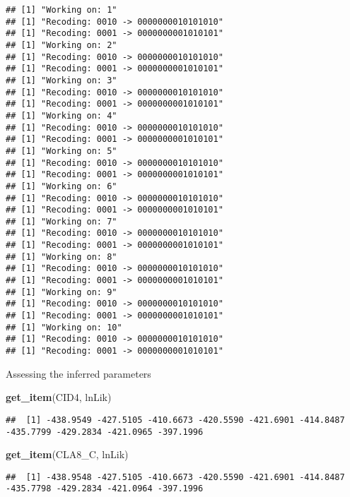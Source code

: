 \documentclass[
]{article}
\newenvironment{Shaded}{\begin{snugshade}}{\end{snugshade}}
\newcommand{\FunctionTok}[1]{\textcolor[rgb]{0.13,0.29,0.53}{\textbf{#1}}}
\newcommand{\NormalTok}[1]{#1}
\newcommand{\StringTok}[1]{\textcolor[rgb]{0.31,0.60,0.02}{#1}}
\begin{document}
\begin{verbatim}
## [1] "Working on: 1"
## [1] "Recoding: 0010 -> 0000000010101010"
## [1] "Recoding: 0001 -> 0000000001010101"
## [1] "Working on: 2"
## [1] "Recoding: 0010 -> 0000000010101010"
## [1] "Recoding: 0001 -> 0000000001010101"
## [1] "Working on: 3"
## [1] "Recoding: 0010 -> 0000000010101010"
## [1] "Recoding: 0001 -> 0000000001010101"
## [1] "Working on: 4"
## [1] "Recoding: 0010 -> 0000000010101010"
## [1] "Recoding: 0001 -> 0000000001010101"
## [1] "Working on: 5"
## [1] "Recoding: 0010 -> 0000000010101010"
## [1] "Recoding: 0001 -> 0000000001010101"
## [1] "Working on: 6"
## [1] "Recoding: 0010 -> 0000000010101010"
## [1] "Recoding: 0001 -> 0000000001010101"
## [1] "Working on: 7"
## [1] "Recoding: 0010 -> 0000000010101010"
## [1] "Recoding: 0001 -> 0000000001010101"
## [1] "Working on: 8"
## [1] "Recoding: 0010 -> 0000000010101010"
## [1] "Recoding: 0001 -> 0000000001010101"
## [1] "Working on: 9"
## [1] "Recoding: 0010 -> 0000000010101010"
## [1] "Recoding: 0001 -> 0000000001010101"
## [1] "Working on: 10"
## [1] "Recoding: 0010 -> 0000000010101010"
## [1] "Recoding: 0001 -> 0000000001010101"
\end{verbatim}

Assessing the inferred parameters

\begin{Shaded}
\begin{Highlighting}[]
\FunctionTok{get\_item}\NormalTok{(CID4, }\StringTok{\textquotesingle{}lnLik\textquotesingle{}}\NormalTok{)}
\end{Highlighting}
\end{Shaded}

\begin{verbatim}
##  [1] -438.9549 -427.5105 -410.6673 -420.5590 -421.6901 -414.8487 -435.7799 -429.2834 -421.0965 -397.1996
\end{verbatim}

\begin{Shaded}
\begin{Highlighting}[]
\FunctionTok{get\_item}\NormalTok{(CLA8\_C, }\StringTok{\textquotesingle{}lnLik\textquotesingle{}}\NormalTok{)}
\end{Highlighting}
\end{Shaded}

\begin{verbatim}
##  [1] -438.9548 -427.5105 -410.6673 -420.5590 -421.6901 -414.8487 -435.7798 -429.2834 -421.0964 -397.1996
\end{verbatim}
\end{document}
